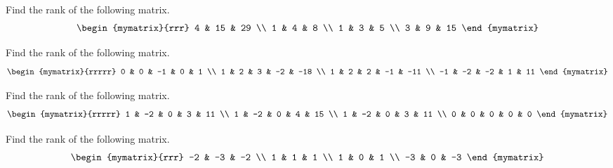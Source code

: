 \begin{ex} Find the rank of the following matrix.
\begin{equation*}
\begin{mymatrix}{rrr}
4 & 15 & 29 \\
1 & 4 & 8 \\
1 & 3 & 5 \\
3 & 9 & 15
\end{mymatrix}
\end{equation*}
\end{ex}

\begin{ex} Find the rank of the following matrix.
\begin{equation*}
\begin{mymatrix}{rrrrr}
0 & 0 & -1 & 0 & 1 \\
1 & 2 & 3 & -2 & -18 \\
1 & 2 & 2 & -1 & -11 \\
-1 & -2 & -2 & 1 & 11
\end{mymatrix}
\end{equation*}
\end{ex}

\begin{ex} Find the rank of the following matrix.
\begin{equation*}
\begin{mymatrix}{rrrrr}
1 & -2 & 0 & 3 & 11 \\
1 & -2 & 0 & 4 & 15 \\
1 & -2 & 0 & 3 & 11 \\
0 & 0 & 0 & 0 & 0
\end{mymatrix}
\end{equation*}
\end{ex}

\begin{ex} Find the rank of the following matrix.
\begin{equation*}
\begin{mymatrix}{rrr}
-2 & -3 & -2 \\
1 & 1 & 1 \\
1 & 0 & 1 \\
-3 & 0 & -3
\end{mymatrix}
\end{equation*}
\end{ex}

